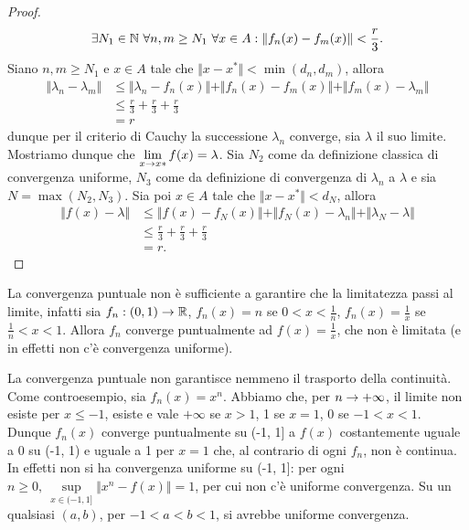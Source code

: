 \documentclass[Completo.tex]{subfiles}
\begin{document}
\begin{proof}
	\begin{equation*}
	\exists N_1 \in \bb[N] \ \forall n,m \geq N_1 \ \forall x \in A: \Vert f_n(x) - f_m(x) \Vert < \frac{r}{3}.
	\end{equation*}
	Siano $n, m \geq N_1$ e $x \in A$ tale che $\Vert x-x^{*}\Vert < \min(d_n, d_m)$, allora
	\begin{align*}
	\Vert \lambda_n - \lambda_m \Vert &\leq \Vert \lambda_n - f_n(x) \Vert + \Vert f_n(x) - f_m(x)\Vert + \Vert f_m(x) - \lambda_m \Vert \\
	&\leq \frac{r}{3} + \frac{r}{3} + \frac{r}{3} \\
	& = r
	\end{align*}
	dunque per il criterio di Cauchy la successione $\lambda_n$ converge, sia $\lambda$ il suo limite. Mostriamo dunque che $\lim\limits_{x \rightarrow x*} f(x) = \lambda$. Sia $N_2$ come da definizione classica di convergenza uniforme, $N_3$ come da definizione di convergenza di $\lambda_n$ a $\lambda$ e sia $N = \max(N_2, N_3)$. Sia poi $x \in A$ tale che $\Vert x - x^{*}\Vert < d_{N}$, allora
	\begin{align*}
	\Vert f(x) - \lambda \Vert &\leq \Vert f(x) - f_{N}(x) \Vert + \Vert f_{N}(x) - \lambda_n \Vert + \Vert \lambda_{N} - \lambda \Vert \\
	&\leq \frac{r}{3} + \frac{r}{3} + \frac{r}{3} \\
	&= r.
	\end{align*}
\end{proof}
\begin{Ex}
	La convergenza puntuale non è sufficiente a garantire che la limitatezza passi al limite, infatti sia $f_n: (0, 1) \ra \bb[R]$, $f_n(x) = n$ se $0 < x < \frac{1}{n}$, $f_n(x) = \frac{1}{x}$ se $\frac{1}{n} < x < 1$. Allora $f_n$ converge puntualmente ad $f(x) = \frac{1}{x}$, che non è limitata (e in effetti non c'è convergenza uniforme).
\end{Ex}
\begin{Ex}
	La convergenza puntuale non garantisce nemmeno il trasporto della continuità. Come controesempio, sia $f_n(x) = x^n$. Abbiamo che, per $n \rightarrow +\infty$, il limite non esiste per $x \leq -1$, esiste e vale $+\infty$ se $x > 1$, 1 se $x = 1$, 0 se $-1 < x < 1$. Dunque $f_n(x)$ converge puntualmente su (-1, 1] a $f(x)$ costantemente uguale a 0 su (-1, 1) e uguale a 1 per $x = 1$ che, al contrario di ogni $f_n$, non è continua. In effetti non si ha convergenza uniforme su (-1, 1]: per ogni $n \geq 0, \ \sup\limits_{x \in (-1,1]} \Vert x^n - f(x) \Vert = 1$, per cui non c'è uniforme convergenza. Su un qualsiasi $(a, b)$, per $-1<a<b<1$, si avrebbe uniforme convergenza.
\end{Ex}
\end{document}
